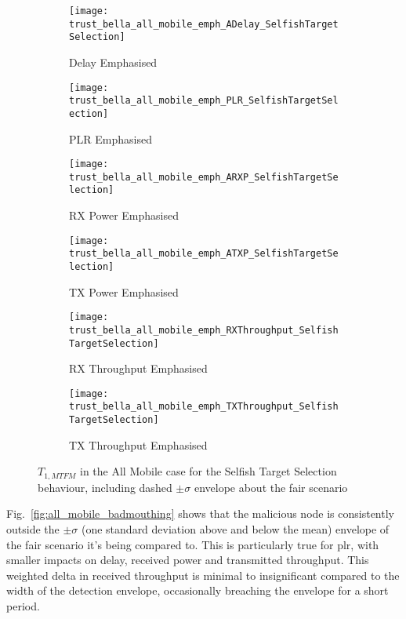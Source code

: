 \begin{figure}[h]
  \centering
  \begin{subfigure}{0.45\textwidth}	
    \texttt{[image: trust\_bella\_all\_mobile\_emph\_ADelay\_SelfishTargetSelection]} 
    \caption{Delay Emphasised}
    \label{fig:all_mobile_selfish_delay}
  \end{subfigure}
  \begin{subfigure}{0.45\textwidth}	
    \texttt{[image: trust\_bella\_all\_mobile\_emph\_PLR\_SelfishTargetSelection]}
    \caption{PLR Emphasised}
    \label{fig:all_mobile_selfish_plr}
  \end{subfigure}

  \begin{subfigure}{0.45\textwidth}	
    \texttt{[image: trust\_bella\_all\_mobile\_emph\_ARXP\_SelfishTargetSelection]}
    \caption{RX Power Emphasised}
    \label{fig:all_mobile_selfish_rxp}
  \end{subfigure}
  \begin{subfigure}{0.45\textwidth}
    \texttt{[image: trust\_bella\_all\_mobile\_emph\_ATXP\_SelfishTargetSelection]}
    \caption{TX Power Emphasised}
    \label{fig:all_mobile_selfish_txp}
  \end{subfigure}

  \begin{subfigure}{0.45\textwidth}
    \texttt{[image: trust\_bella\_all\_mobile\_emph\_RXThroughput\_SelfishTargetSelection]} 
    \caption{RX Throughput Emphasised}
    \label{fig:all_mobile_selfish_rxthroughput}
  \end{subfigure}
  \begin{subfigure}{0.45\textwidth}
    \texttt{[image: trust\_bella\_all\_mobile\_emph\_TXThroughput\_SelfishTargetSelection]} 
    \caption{TX Throughput Emphasised}
    \label{fig:all_mobile_selfish_txthroughput}
  \end{subfigure}
  \caption{$T_{1,MTFM}$ in the All Mobile case for the Selfish Target Selection behaviour, including dashed $\pm\sigma$ envelope about the fair scenario}
  \label{fig:all_mobile_selfish}
\end{figure}

Fig.~\ref{fig:all_mobile_badmouthing} shows that the malicious node is consistently outside the $\pm\sigma$ (one standard deviation above and below the mean) envelope of the fair scenario it's being compared to.
This is particularly true for \gls{plr}, with smaller impacts on delay, received power and transmitted throughput. 
This weighted delta in received throughput is minimal to insignificant compared to the width of the detection envelope, occasionally breaching the envelope for a short period. 

